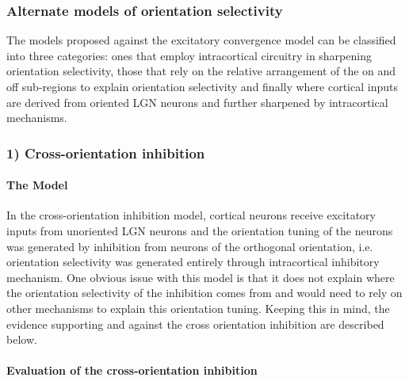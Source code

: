 \subsubsection{Alternate models of orientation selectivity}

The models proposed against the excitatory convergence model can be classified into three categories: ones that employ intracortical circuitry in sharpening orientation selectivity, those that rely on the relative arrangement of the on and off sub-regions to explain orientation selectivity and finally where cortical inputs are derived from oriented LGN neurons and further sharpened by intracortical mechanisms.

\subsubsection{1) Cross-orientation inhibition}

\paragraph{The Model} In the cross-orientation inhibition model, cortical neurons receive excitatory inputs from unoriented LGN neurons and the orientation tuning of the neurons was generated by inhibition from neurons of the orthogonal orientation, i.e. orientation selectivity was generated entirely through intracortical inhibitory mechanism. One obvious issue with this model is that it does not explain where the orientation selectivity of the inhibition comes from and would need to rely on other mechanisms to explain this orientation tuning. Keeping this in mind, the evidence supporting and against the cross orientation inhibition are described below. 

\paragraph{Evaluation of the cross-orientation inhibition}

